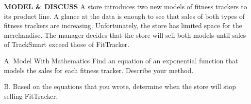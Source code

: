 \documentclass{article}
\newenvironment{model-discuss}{}{}      %
\newcommand{\answer}[1]{}               %
\newcommand{\placeholder}[2]{}          %
\newcommand{\te}[1]{}                   %
\begin{document}
\begin{model-discuss}
\textbf{MODEL \& DISCUSS}
A store introduces two new models of fitness trackers to its product line. A glance at the data is enough to see that sales of both types of fitness trackers are increasing. Unfortunately, the store has limited space for the merchandise. The manager decides that the store will sell both models until sales of TrackSmart exceed those of FitTracker.
\placeholder{diagram}{Two stair-step displays, FitTracker Number Sold in blue and TrackSmart Number Sold in green, each with a fitness tracker icon. Four steps labeled Week 4, Week 3, Week 2, Week 1 from top to bottom. FitTracker values 228,112,54,28; TrackSmart values 130,44,17,5.}
A. Model With Mathematics Find an equation of an exponential function that models the sales for each fitness tracker. Describe your method.
\answer{I used my calculator to find the exponential regression models for each set of data. The exponential model for FitTracker is (y=13.6266(2.0180)^x), and the exponential model for TrackSmart is (y=1.8081(2.9227)^x).}
B. Based on the equations that you wrote, determine when the store will stop selling FitTracker.
\answer{Graph both equations on a graphing calculator. The graphs intersect near (x=6), so the store will stop selling FitTracker after 6 weeks.}
\te{Digital activity repeats the data and questions with Go back and answer boxes; Part A is labeled Use Appropriate Tools. Digital paragraph names Fit Track and Track Smart, while the student page names FitTracker and TrackSmart.}
\end{model-discuss}
\end{document}
